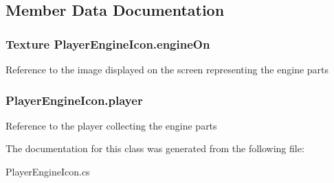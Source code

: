 \subsection{Member Data Documentation}
\hypertarget{class_player_engine_icon_aa98ba90a581a22a8a13527076251325c}{
\subsubsection[{engine\-On}]{\setlength{\rightskip}{0pt plus 5cm}Texture Player\-Engine\-Icon.\-engine\-On}}\label{class_player_engine_icon_aa98ba90a581a22a8a13527076251325c}
Reference to the image displayed on the screen representing the engine parts \hypertarget{class_player_engine_icon_aa4786c7c7622809d7361e6a35dfac6c5}{
\subsubsection[{player}]{ Player\-Engine\-Icon.\-player}}\label{class_player_engine_icon_aa4786c7c7622809d7361e6a35dfac6c5}
Reference to the player collecting the engine parts 

The documentation for this class was generated from the following file\-:\begin{DoxyCompactItemize}
\item 
Player\-Engine\-Icon.\-cs\end{DoxyCompactItemize}
